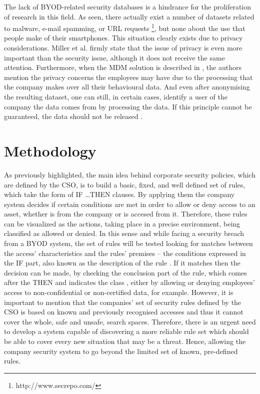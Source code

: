 \documentclass[a4paper,10pt,twocolumn,preprint,3p]{elsarticle}
\begin{document}
The lack of BYOD-related security databases is a hindrance for the
proliferation of research in this field. As seen, there actually exist
a number of datasets related to malware, e-mail spamming, or URL
requests \footnote{http://www.secrepo.com/}, but none about the use
that people make of their smartphones. This situation clearly exists
due to privacy considerations. Miller et al. \cite{Miller201253}
firmly state that the issue of privacy is even more important than the
security issue, although it does not receive the same
attention. Furthermore, when the MDM solution is described in
\cite{ali2015analysis}, the authors mention the privacy concerns the
employees may have due to the processing that the company makes over
all their behavioural data. And even after anonymising the resulting
dataset, one can still, in certain cases, identify a user of the
company the data comes from by processing the data. If this principle
cannot be guaranteed, the data should not be released
\cite{boillat2014handbook}. 

\section{Methodology}
\label{sec:methodology}

As previously highlighted, the main idea behind corporate security
policies, which are defined by the CSO, is to build a basic, fixed,
and well defined set of rules, which take the form of \textsc{IF
  \ldots THEN} clauses. By applying them the company system decides if certain conditions are met in order to allow or
deny access to an asset, whether is from the company or is accesed from it. 
Therefore, these rules can be visualized as the actions, taking place in a precise environment, being classified as
allowed or denied. In this sense and while facing a security breach
from a BYOD system, the set of rules will be tested looking for
matches between the access' characteristics and the rules' premises --
the conditions expressed in the IF part, also known as the description
of the rule \cite{DeFalco2002257}. If it matches then the decision can
be made, by checking the conclusion part of the rule, which comes
after the THEN and indicates the class \cite{DeFalco2002257}, either
by allowing or denying employees' access to non-confidential
 or non-certified data, for example. However, it is important to
 mention that the companies'  set of security rules defined by the CSO is
 based on known and previously recognised accesses and thus it cannot
 cover the whole, safe and unsafe, search spaces. Therefore,
 there is an urgent need to develop a system capable of discovering a
 more reliable rule set which should be able to cover every new
 situation that may be a threat. Hence, allowing the company security
 system to go beyond the limited set of known, pre-defined rules.  %
\end{document}
